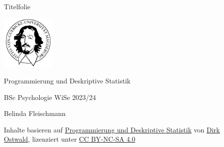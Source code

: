 \documentclass[
  8pt,
  ignorenonframetext,
]{beamer}
\author{}
\date{}
\begin{document}
\ifdefined\Shaded\renewenvironment{Shaded}{\begin{tcolorbox}[breakable, boxrule=0pt, sharp corners, borderline west={3pt}{0pt}{shadecolor}, interior hidden, enhanced, frame hidden]}{\end{tcolorbox}}\fi

\begin{frame}[plain]{Titelfolie}
\protect\hypertarget{titelfolie}{}
\center

\includegraphics[width=0.2\textwidth,height=\textheight]{../Abbildungen/otto.png}

\vspace{2mm}

\Large

Programmierung und Deskriptive Statistik \vspace{4mm}

\normalsize

BSc Psychologie WiSe 2023/24

\vspace{15mm}
\normalsize

Belinda Fleischmann

\vspace{3mm}
\scriptsize

Inhalte basieren auf
\href{https://www.ipsy.ovgu.de/ipsy_media/Methodenlehre+I/Wintersemester+2122/Programmierung+und+Deskriptive+Statistik/Vorlesungsfolien.pdf}{Programmierung
und Deskriptive Statistik} von
\href{https://www.ipsy.ovgu.de/Institut/Abteilungen+des+Institutes/Methodenlehre+I+_+Experimentelle+und+Neurowissenschaftliche+Psychologie/Team/Dirk+Ostwald.html}{Dirk
Ostwald}, lizenziert unter
\href{https://creativecommons.org/licenses/by-sa/4.0/deed.de}{CC
BY-NC-SA 4.0}
\end{frame}
\end{document}
